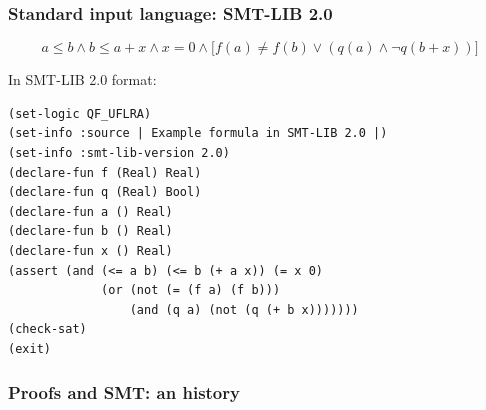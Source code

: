 \documentclass[svgnames,table,mathserif]{beamer}
\begin{document}
\begin{frame}[fragile]
  \frametitle{Standard input language: SMT-LIB 2.0}
  
  \begin{displaymath}
    a \leq b \wedge b \leq a + x \wedge x = 0 \wedge
    \big[ f(a) \neq f(b) \vee (q(a) \wedge \neg q(b + x)) \big]
  \end{displaymath}

\vspace*{5pt}
In SMT-LIB 2.0 format:
{\footnotesize
\begin{verbatim}
(set-logic QF_UFLRA)
(set-info :source | Example formula in SMT-LIB 2.0 |)
(set-info :smt-lib-version 2.0)
(declare-fun f (Real) Real)
(declare-fun q (Real) Bool)
(declare-fun a () Real)
(declare-fun b () Real)
(declare-fun x () Real)
(assert (and (<= a b) (<= b (+ a x)) (= x 0)
             (or (not (= (f a) (f b)))
                 (and (q a) (not (q (+ b x)))))))
(check-sat)
(exit)
\end{verbatim}
}

\end{frame}


\begin{frame}
  \frametitle{Proofs and SMT: an history}

\end{frame}

\end{document}
